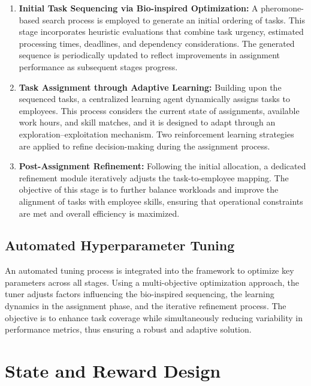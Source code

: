 \documentclass[%
aip,
cp,  %
amsmath,amssymb,
reprint,%
]{revtex4-2}
\begin{document}
	\begin{enumerate}
		\item \textbf{Initial Task Sequencing via Bio-inspired Optimization:} A
		pheromone-based search process is employed to generate an initial ordering
		of tasks. This stage incorporates heuristic evaluations that combine task urgency,
		estimated processing times, deadlines, and dependency considerations. The generated
		sequence is periodically updated to reflect improvements in assignment performance
		as subsequent stages progress.
		
		\item \textbf{Task Assignment through Adaptive Learning:} Building upon the
		sequenced tasks, a centralized learning agent dynamically assigns tasks to
		employees. This process considers the current state of assignments, available
		work hours, and skill matches, and it is designed to adapt through an exploration–exploitation
		mechanism. Two reinforcement learning strategies are applied to refine
		decision-making during the assignment process.
		
		\item \textbf{Post-Assignment Refinement:} Following the initial allocation,
		a dedicated refinement module iteratively adjusts the task-to-employee mapping.
		The objective of this stage is to further balance workloads and improve
		the alignment of tasks with employee skills, ensuring that operational constraints
		are met and overall efficiency is maximized.
	\end{enumerate}
	
	\subsection{\label{subsec:tuning}Automated Hyperparameter Tuning}
	
	An automated tuning process is integrated into the framework to optimize key parameters
	across all stages. Using a multi-objective optimization approach, the tuner adjusts
	factors influencing the bio-inspired sequencing, the learning dynamics in the
	assignment phase, and the iterative refinement process. The objective is to
	enhance task coverage while simultaneously reducing variability in performance
	metrics, thus ensuring a robust and adaptive solution.
	
	\section{\label{sec:state}State and Reward Design}
	
\end{document}
